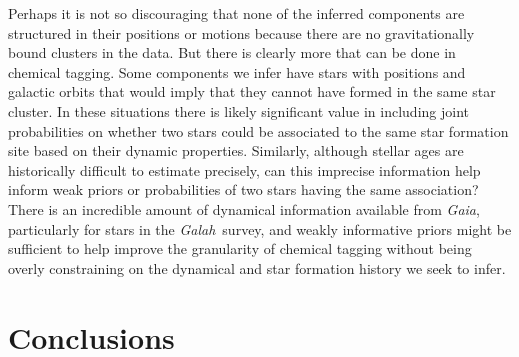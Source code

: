\documentclass[twocolumn]{aastex62}
\newcommand{\project}[1]{\textsl{#1}}
\newcommand{\Galah}{\project{Galah}}
\begin{document}
Perhaps it is not so discouraging that none of the inferred components are structured in their positions or motions because there are no gravitationally bound clusters in the data. But there is clearly more that can be done in chemical tagging. Some components we infer have stars with positions and galactic orbits that would imply that they cannot have formed in the same star cluster. In these situations there is likely significant value in including joint probabilities on whether two stars could be associated to the same star formation site based on their dynamic properties. Similarly, although stellar ages are historically difficult to estimate precisely, can this imprecise information help inform weak priors or probabilities of two stars having the same association? There is an incredible amount of dynamical information available from \project{Gaia}, particularly for stars in the \Galah\ survey, and weakly informative priors might be sufficient to help improve the granularity of chemical tagging without being overly constraining on the dynamical and star formation history we seek to infer.








\section{Conclusions} \label{sec:conclusions}
\end{document}
